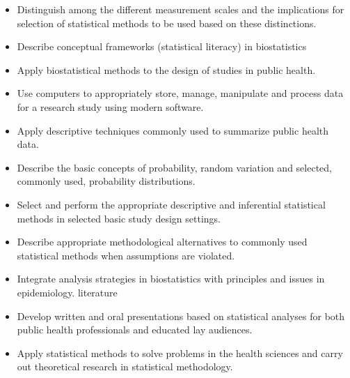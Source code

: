 \documentclass[10pt]{article}
\begin{document}
  \clearpage
\bigskip
{}
\begin{itemize}
\item Distinguish among the different measurement scales and the implications for selection of statistical methods to be used based on these distinctions.
\item Describe conceptual frameworks (statistical literacy) in biostatistics
\item Apply biostatistical methods to the design of studies in public health.
\item Use computers to appropriately store, manage, manipulate and process data for a research study using modern software.
\item Apply descriptive techniques commonly used to summarize public health data. 
\item Describe the basic concepts of probability, random variation and selected, commonly used, probability distributions.
\item Select and perform the appropriate descriptive and inferential statistical methods in selected basic study design settings.
\item Describe appropriate methodological alternatives to commonly used statistical methods when assumptions are violated.
\item Integrate analysis strategies in biostatistics with principles and issues in epidemiology.
literature
\item Develop written and oral presentations based on statistical analyses for both public health professionals and educated lay audiences.
\item Apply statistical methods to solve problems in the health sciences and carry out theoretical research in statistical methodology.
\end{itemize}
  
\end{document}
